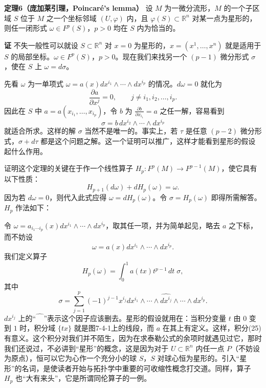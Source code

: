 \noindent\textbf{定理6（庞加莱引理，Poincaré's lemma）}
设 $M$ 为一微分流形，$M$ 的一个子区域 $S$ 位于 $M$ 之一个坐标邻域 $(U,\varphi)$ 内，且 $\varphi(S)\subset\mathbb R^n$ 对某一点为星形的，则任一闭形式 $\omega\in F^p(S)$，$p>0$ 均在 $S$ 内为恰当的。

\noindent\textbf{证}
不失一般性可以就设 $S\subset\mathbb R^n$ 对 $x=0$ 为星形的，$x=(x^1,\ldots,x^n)$ 就是适用于 $S$ 的局部坐标。$\omega\in F^p(S)$，$p>0$。现在我们来找另一个 $(p-1)$ 微分形式 $\sigma$，使在 $S$ 上 $\omega=d\sigma$。

先看 $\omega$ 为一单项式 $\omega=a(x)dx^{i_1}\wedge\cdots\wedge dx^{i_p}$ 的情况。$d\omega=0$ 就化为
\[
 \frac{\partial a}{\partial x^j}=0,\qquad j\ne i_1,i_2,\ldots,i_p.
\]
因此在 $S$ 中 $a=a(x_{i_1},\ldots,x_{i_p})$，令 $b$ 为 $\frac{\partial b}{\partial x_{i_1}}=a$ 之任一解，容易看到
\[
 \sigma=b\,dx^{i_2}\wedge\cdots\wedge dx^{i_p}
\]
就适合所求。这样的解 $\sigma$ 当然不是唯一的。事实上，若 $\tau$ 是任意 $(p-2)$ 微分形式，$\sigma+d\tau$ 都是这个问题之解。这一个证明可以推广，这样才能看到星形的假设起什么作用。

证明这个定理的关键在于作一个线性算子 $H_p:F^p(M)\to F^{p-1}(M)$，使它具有以下性质：
\begin{equation}
 H_{p+1}(d\omega)+dH_p(\omega)=\omega.
 \tag{24}
\end{equation}
因为若 $d\omega=0$，则代入此式应得 $\omega=dH_p(\omega)$。令 $\sigma=H_p(\omega)$ 即得所需解答。$H_p$ 作法如下：

令 $\omega=a_{i_1\cdots i_p}(x)dx^{i_1}\wedge\cdots\wedge dx^{i_p}$，取其任一项，并为简单起见，略去 $a$ 之下标，而不妨设
\[
 \omega=a(x)dx^{i_1}\wedge\cdots\wedge dx^{i_p}.
\]
我们定义算子
\begin{equation}
 H_p(\omega)=\int_0^1 a(tx)t^{p-1}\,dt\;\sigma,
 \tag{25}
\end{equation}
其中
\begin{equation}
 \sigma=\sum_{j=1}^p(-1)^{j-1}x^{i_j}
 dx^{i_1}\wedge\cdots\wedge\widehat{dx^{i_j}}\wedge\cdots\wedge dx^{i_p}.
 \tag{26}
\end{equation}
$dx^{i_j}$ 上的“$\widehat{\phantom{dx}}$”表示这个因子应该删去。星形的假设就用在：当积分变量 $t$ 由 $0$ 变到 $1$ 时，积分域 $\{tx\}$ 就是图7-4-1上的线段，而 $a$ 在其上有定义。这样，积分(25)有意义。这个积分对我们并不陌生，因为在求泰勒公式的余项时就遇见过它，那时我们还说过，不必讲到“星形”的概念，这是因为对于 $U\subset\mathbb R^n$ 内任一点 $P$（不妨设为原点），恒可以它为心作一个充分小的球 $S$，$S$ 对球心恒为星形的。引入“星形”的名词，是使读者开始与拓扑学中重要的可收缩性概念打交道。同样，算子 $H_p$ 也“大有来头”，它是所谓同伦算子的一例。

